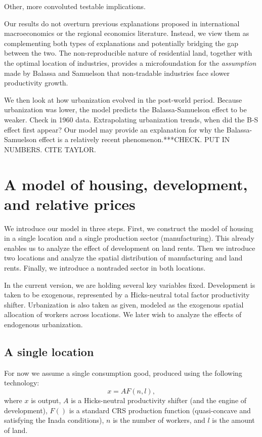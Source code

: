 \documentclass[12pt]{article}
\begin{document}
Other, more convoluted testable implications.

Our results do not overturn previous explanations proposed in international macroeconomics or the regional economics literature. Instead, we view them as complementing both types of explanations and potentially bridging the gap between the two. The non-reproducible nature of residential land, together with the optimal location of industries, provides a microfoundation for the \emph{assumption} made by Balassa and Samuelson that non-tradable industries face slower productivity growth.

We then look at how urbanization evolved in the post-world period. Because urbanization was lower, the model predicts the Balassa-Samuelson effect to be weaker. Check in 1960 data. Extrapolating urbanization trends, when did the B-S effect first appear? Our model may provide an explanation for why the Balassa-Samuelson effect is a relatively recent phenomenon.***CHECK. PUT IN NUMBERS. CITE TAYLOR.


\section{A model of housing, development, and relative prices}
We introduce our model in three steps. First, we construct the model of housing in a single location and a single production sector (manufacturing). This already enables us to analyze the effect of development on land rents. Then we introduce two locations and analyze the spatial distribution of manufacturing and land rents. Finally, we introduce a nontraded sector in both locations.

In the current version, we are holding several key variables fixed. Development is taken to be exogenous, represented by a Hicks-neutral total factor productivity shifter. Urbanization is also taken as given, modeled as the exogenous spatial allocation of workers across locations. We later wish to analyze the effects of endogenous urbanization.
\subsection{A single location}
For now we assume a single consumption good, produced using the following technology:
\[
x = AF(n,l),
\]
where $x$ is output, $A$ is a Hicks-neutral productivity shifter (and the engine of development), $F()$ is a standard CRS production function (quasi-concave and satisfying the Inada conditions), $n$ is the number of workers, and $l$ is the amount of land.
\end{document}
